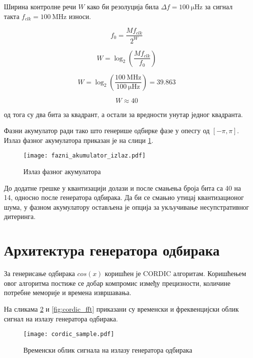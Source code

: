 \documentclass[conference]{IEEEJERM}
\begin{document}
Ширина контролне речи $W$ како би резолуција била $ \Delta f = \SI{100}{\micro\hertz}$ за сигнал такта $f_{clk} = \SI{100}{\mega\hertz}$ износи.

\begin{equation}
f_0 = \dfrac{M f_{clk}}{2^W}
\end{equation}

\begin{equation}
W = \log_2 \left(\dfrac{M f_{clk}}{ f_0}\right)
\end{equation}

\begin{equation}
W = \log_2 \left(\dfrac{\SI{100}{\mega \hertz}}{\SI{100}{\micro \hertz}}\right) = 39.863 
\end{equation}

\begin{equation}
W \approx 40
\end{equation}

од тога су два бита за квадрант, а остали за вредности унутар једног квадранта.

Фазни акумулатор ради тако што генерише одбирке фазе у опесгу од $\left[-\pi, \pi \right]$.
Излаз фазног акумулатора приказан је на слици \ref{fig:fai}.

\begin{figure}[H]
	\centering
	\texttt{[image: fazni\_akumulator\_izlaz.pdf]}
	\caption{Излаз фазног акумулатора}
	\label{fig:fai}
\end{figure}

До додатне грешке у квантизацији долази и после смањења броја бита са 40 на 14, односно после генератора одбирака.
Да би се смањио утицај квантизационог шума, у фазном акумулатору остављена је опција за укључивање несупстративног дитеринга.


\section{Архитектура генератора одбирака}

За генерисање одбирака  $cos(x)$ коришћен је CORDIC алгоритам. Коришћењем овог алгоритма постиже се добар компромис између прецизности, 
количине потребне меморије и времена извршавања.	

На сликама \ref{fig:cordic_sample} и \ref{fig:cordic_fft} приказани су временски и фреквенцијски облик сигнал на излазу генератора одбирака.

\begin{figure}[t]
	\centering
	\texttt{[image: cordic\_sample.pdf]}
	\caption{Временски облик сигнала на излазу генератора одбирака}
	\label{fig:cordic_sample}
\end{figure}
\end{document}
